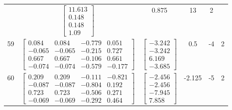 \documentclass[a4paper,12pt]{article}
\begin{document}
\begin{tabular}{c c c c c c}
&
$\begin{bmatrix} 11.613 \\ 0.148 \\ 0.148 \\ 1.09 \end{bmatrix}$
&
0.875
&
13
&
2
\\
59
&
$\begin{bmatrix} 0.084 & 0.084 & -0.779 & 0.051 \\ -0.065 & -0.065 & -0.215 & 0.727 \\ 0.667 & 0.667 & -0.106 & 0.661 \\ -0.074 & -0.074 & -0.579 & -0.177 \end{bmatrix}$
&
$\begin{bmatrix} -3.242 \\ -3.242 \\ 6.169 \\ -3.685 \end{bmatrix}$
&
0.5
&
-4
&
2
\\
60
&
$\begin{bmatrix} 0.209 & 0.209 & -0.111 & -0.821 \\ -0.087 & -0.087 & -0.804 & 0.192 \\ 0.723 & 0.723 & -0.506 & 0.271 \\ -0.069 & -0.069 & -0.292 & 0.464 \end{bmatrix}$
&
$\begin{bmatrix} -2.456 \\ -2.456 \\ -7.945 \\ 7.858 \end{bmatrix}$
&
-2.125
&
-5
&
2
\\
\end{tabular} \egroup \newpage
\end{document}
